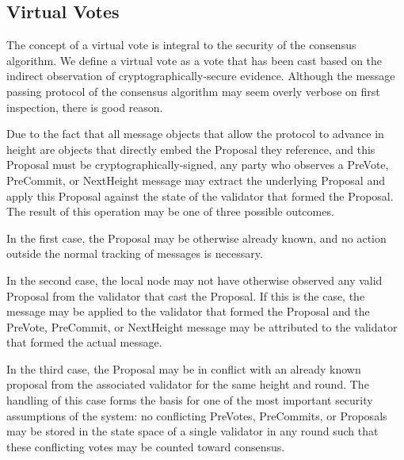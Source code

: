 \subsection{Virtual Votes}

The concept of a virtual vote is integral to the security of the
\LayerTwoLong{} consensus algorithm.
We define a virtual vote as a vote that has been cast based on the
indirect observation of cryptographically-secure evidence.
Although the message passing protocol of the consensus algorithm may
seem overly verbose on first inspection, there is good reason.

Due to the fact that all message objects that allow the protocol to
advance in height are objects that directly embed the Proposal they
reference, and this Proposal must be cryptographically-signed, any
party who observes a PreVote, PreCommit, or NextHeight message may
extract the underlying Proposal and apply this Proposal against the
state of the validator that formed the Proposal.
The result of this operation may be one of three possible outcomes.

In the first case, the Proposal may be otherwise already known, and no
action outside the normal tracking of messages is necessary.

In the second case, the local node may not have otherwise observed any
valid Proposal from the validator that cast the Proposal.
If this is the case, the message may be applied to the validator that
formed the Proposal and the PreVote, PreCommit, or NextHeight message
may be attributed to the validator that formed the actual message.

In the third case, the Proposal may be in conflict with an already
known proposal from the associated validator for the same height and
round.
The handling of this case forms the basis for one of the most important
security assumptions of the system: no conflicting PreVotes,
PreCommits, or Proposals may be stored in the state space of a single
validator in any round such that these conflicting votes may be counted
toward consensus.

